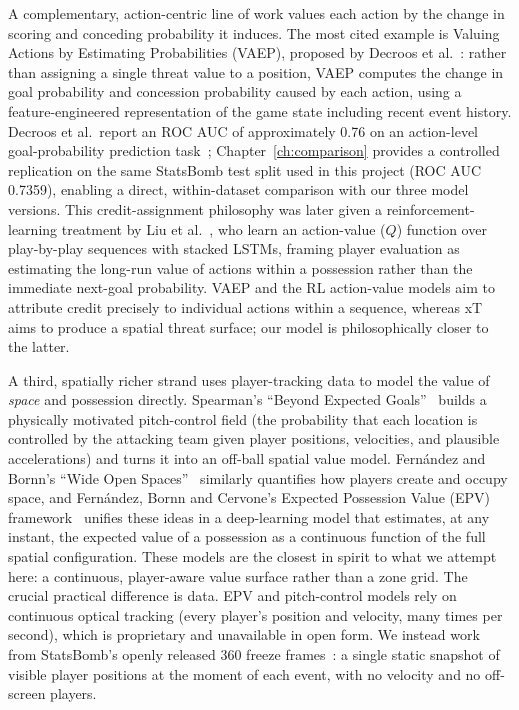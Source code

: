A complementary, action-centric line of work values each action by the change in scoring and conceding probability it induces. The most cited example is Valuing Actions by Estimating Probabilities (VAEP), proposed by Decroos et al.~\cite{decroos2019}: rather than assigning a single threat value to a position, VAEP computes the change in goal probability and concession probability caused by each action, using a feature-engineered representation of the game state including recent event history. Decroos et al.\ report an ROC AUC of approximately 0.76 on an action-level goal-probability prediction task~\cite{decroos2019}; Chapter~\ref{ch:comparison} provides a controlled replication on the same StatsBomb test split used in this project (ROC AUC 0.7359), enabling a direct, within-dataset comparison with our three model versions. This credit-assignment philosophy was later given a reinforcement-learning treatment by Liu et al.~\cite{liu2020deep}, who learn an action-value ($Q$) function over play-by-play sequences with stacked LSTMs, framing player evaluation as estimating the long-run value of actions within a possession rather than the immediate next-goal probability. VAEP and the RL action-value models aim to attribute credit precisely to individual actions within a sequence, whereas xT aims to produce a spatial threat surface; our model is philosophically closer to the latter.

A third, spatially richer strand uses player-tracking data to model the value of \emph{space} and possession directly. Spearman's ``Beyond Expected Goals''~\cite{spearman2018} builds a physically motivated pitch-control field (the probability that each location is controlled by the attacking team given player positions, velocities, and plausible accelerations) and turns it into an off-ball spatial value model. Fernández and Bornn's ``Wide Open Spaces''~\cite{fernandez2018space} similarly quantifies how players create and occupy space, and Fernández, Bornn and Cervone's Expected Possession Value (EPV) framework~\cite{fernandez2019epv} unifies these ideas in a deep-learning model that estimates, at any instant, the expected value of a possession as a continuous function of the full spatial configuration. These models are the closest in spirit to what we attempt here: a continuous, player-aware value surface rather than a zone grid. The crucial practical difference is data. EPV and pitch-control models rely on continuous optical tracking (every player's position and velocity, many times per second), which is proprietary and unavailable in open form. We instead work from StatsBomb's openly released 360 freeze frames~\cite{statsbomb360}: a single static snapshot of visible player positions at the moment of each event, with no velocity and no off-screen players.

